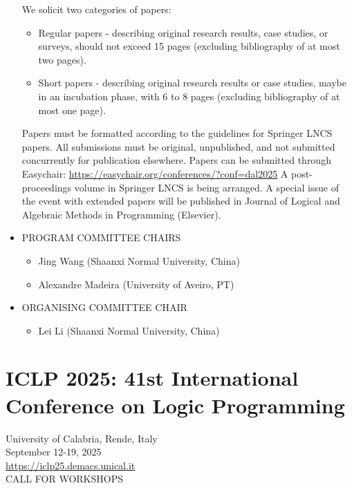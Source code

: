 \documentclass[prodmode,acmtecs]{acmsmall} %
\begin{document}
\begin{itemize}
  We solicit two categories of papers: 
 
\begin{itemize}\item  Regular papers - describing original research results, case studies, or surveys, should not exceed 15 pages (excluding bibliography of at most two pages).
\item  Short papers - describing original research results or case studies, maybe in an incubation phase, with 6 to 8 pages (excluding bibliography of at most one page).
\end{itemize} 
  Papers must be formatted according to the guidelines for Springer LNCS papers. All submissions must be original, unpublished, and not submitted concurrently for publication elsewhere. Papers can be submitted through Easychair: \href{https://easychair.org/conferences/?conf=dal2025}{https://easychair.org/conferences/?conf=dal2025} A post-proceedings volume in Springer LNCS is being arranged. A special issue of the event with extended papers will be published in Journal of Logical and Algebraic Methods in Programming (Elsevier). 
 
\item  PROGRAM COMMITTEE CHAIRS 
 
\begin{itemize}\item  Jing Wang (Shaanxi Normal University, China)
\item  Alexandre Madeira (University of Aveiro, PT)
\end{itemize} 
\item  ORGANISING COMMITTEE CHAIR 
 
\begin{itemize}\item  Lei Li (Shaanxi Normal University, China)
\end{itemize} 
\end{itemize}\section{ICLP 2025: 41st International Conference on Logic Programming }\label{ICLP2025}  University of Calabria, Rende, Italy \\ 
  September 12-19, 2025\\ 
  \href{https://iclp25.demacs.unical.it}{https://iclp25.demacs.unical.it}\\ 
CALL FOR WORKSHOPS 
\end{document}
